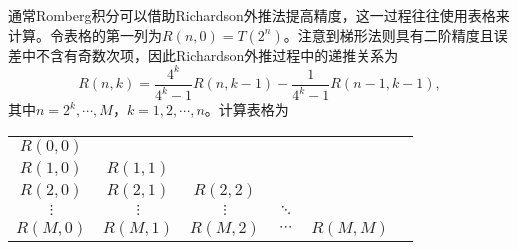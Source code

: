 \documentclass[a4paper,10pt]{ctexart}
\begin{document}
通常Romberg积分可以借助Richardson外推法提高精度，这一过程往往使用表格来计算。令表格的第一列为$ R(n,0)=T(2^n) $。注意到梯形法则具有二阶精度且误差中不含有奇数次项，因此Richardson外推过程中的递推关系为
\begin{equation}
    R(n,k) = \frac{4^k}{4^k-1}R(n,k-1) - \frac{1}{4^k-1}R(n-1,k-1),
\end{equation}
其中$ n=2^k,\cdots ,M $，$ k=1,2,\cdots ,n $。计算表格为
\begin{center}
    \begin{tabular}{cccccc}
        \toprule
        $ R(0,0) $ & & & & & \\
        $ R(1,0) $ & $ R(1,1) $ & & & & \\
        $ R(2,0) $ & $ R(2,1) $ & $ R(2,2) $ & & & \\
        $ \vdots $ & $ \vdots $ & $ \vdots $ & $ \ddots $ & & \\
        $ R(M,0) $ & $ R(M,1) $ & $ R(M,2) $ & $ \cdots $ & $ R(M,M) $ & \\
        \bottomrule
    \end{tabular}
\end{center}
\end{document}
